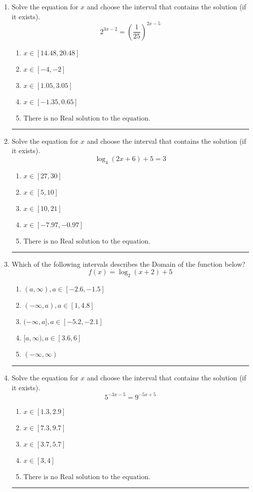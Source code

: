 \documentclass[14pt]{extbook}
\newcommand{\litem}[1]{\item#1\hspace*{-1cm}\rule{\textwidth}{0.4pt}}
\begin{document}
\begin{enumerate}
\litem{
Solve the equation for $x$ and choose the interval that contains the solution (if it exists).\[ 2^{3x-2} = \left(\frac{1}{25}\right)^{2x-5} \]\begin{enumerate}[label=\Alph*.]
\item \( x \in [14.48, 20.48] \)
\item \( x \in [-4, -2] \)
\item \( x \in [1.05, 3.05] \)
\item \( x \in [-1.35, 0.65] \)
\item \( \text{There is no Real solution to the equation.} \)

\end{enumerate} }
\litem{
Solve the equation for $x$ and choose the interval that contains the solution (if it exists).\[ \log_{4}{(2x+6)}+5 = 3 \]\begin{enumerate}[label=\Alph*.]
\item \( x \in [27, 30] \)
\item \( x \in [5, 10] \)
\item \( x \in [10, 21] \)
\item \( x \in [-7.97, -0.97] \)
\item \( \text{There is no Real solution to the equation.} \)

\end{enumerate} }
\litem{
Which of the following intervals describes the Domain of the function below?\[ f(x) = \log_2{(x+2)}+5 \]\begin{enumerate}[label=\Alph*.]
\item \( (a, \infty), a \in [-2.6, -1.5] \)
\item \( (-\infty, a), a \in [1, 4.8] \)
\item \( (-\infty, a], a \in [-5.2, -2.1] \)
\item \( [a, \infty), a \in [3.6, 6] \)
\item \( (-\infty, \infty) \)

\end{enumerate} }
\litem{
Solve the equation for $x$ and choose the interval that contains the solution (if it exists).\[ 5^{-3x-5} = 9^{-5x+5} \]\begin{enumerate}[label=\Alph*.]
\item \( x \in [1.3, 2.9] \)
\item \( x \in [7.3, 9.7] \)
\item \( x \in [3.7, 5.7] \)
\item \( x \in [3, 4] \)
\item \( \text{There is no Real solution to the equation.} \)


\end{enumerate}}
\end{enumerate}
\end{document}
